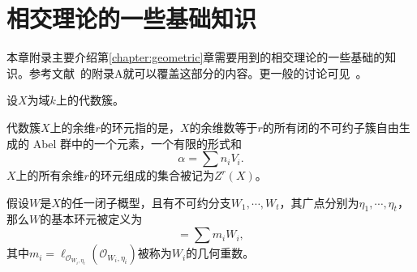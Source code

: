 

\chapter{相交理论的一些基础知识}
\label{apdx: intersection theory}

本章附录主要介绍第\ref{chapter:geometric}章需要用到的相交理论的一些基础的知识。参考文献~的附录A就可以覆盖这部分的内容。更一般的讨论可见~。

设$X$为域$k$上的代数簇。

\begin{definition}
代数簇$X$上的余维$r$的环元指的是，$X$的余维数等于$r$的所有闭的不可约子簇自由生成的 Abel 群中的一个元素，一个有限的形式和
\begin{equation}
\alpha = \sum n_i V_i.
\end{equation}
$X$上的所有余维$r$的环元组成的集合被记为$Z^r(X)$。
\end{definition}

\begin{example}
假设$W$是$X$的任一闭子概型，且有不可约分支$W_1,\cdots,W_t$，其广点分别为$\eta_1,\cdots,\eta_t$，那么$W$的基本环元被定义为
\begin{equation}
[W] = \sum\limits m_i W_i,
\end{equation}
其中$m_i = \ell_{\mathcal{O}_{W_i,\eta_i}}(\mathcal{O}_{W_i,\eta_i})$被称为$W_i$的几何重数。
\end{example}

